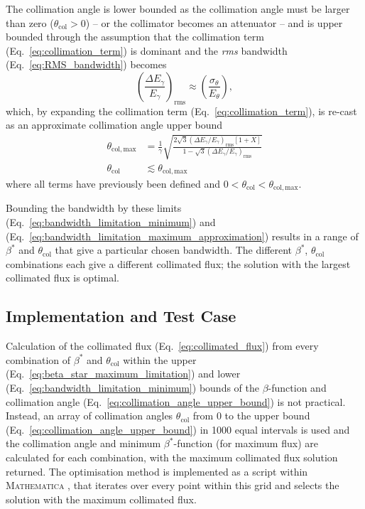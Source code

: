 \documentclass[../main.tex]{subfiles}
\begin{document}
The collimation angle is lower bounded as the collimation angle must be larger than zero ($\theta_{\mathrm{col}}>0$) -- or the collimator becomes an attenuator -- and is upper bounded through the assumption that the collimation term (Eq.~\ref{eq:collimation_term}) is dominant and the \textit{rms} bandwidth (Eq.~\ref{eq:RMS_bandwidth}) becomes
\begin{equation}
\left(\frac{\Delta E_{\gamma}}{E_{\gamma}}\right)_{\mathrm{rms}} \approx \left(\frac{\sigma_{\theta}}{E_{\theta}}\right),    
\label{eq:collimation_dominant}
\end{equation}
which, by expanding the collimation term (Eq.~\ref{eq:collimation_term}), is re-cast as an approximate collimation angle upper bound  
\begin{align}
\theta_{\mathrm{col},\mathrm{max}} &= \frac{1}{\gamma}\sqrt{\frac{2\sqrt{3}\left(\Delta E_{\gamma}/E_{\gamma}\right)_{\mathrm{rms}}\left[1+X\right]}{1-\sqrt{3}\left(\Delta E_{\gamma}/E_{\gamma}\right)_{\mathrm{rms}}}} \nonumber\\
\theta_{\mathrm{col}} &\lesssim \theta_{\mathrm{col},\mathrm{max}}
\label{eq:collimation_angle_upper_bound}    
\end{align}
where all terms have previously been defined and $0<\theta_{\mathrm{col}}<\theta_{\mathrm{col},\mathrm{max}}$.
 
Bounding the bandwidth by these limits (Eq.~\ref{eq:bandwidth_limitation_minimum}) and  (Eq.~\ref{eq:bandwidth_limitation_maximum_approximation}) results in a range of $\beta^{*}$ and $\theta_{\mathrm{col}}$ that give a particular chosen bandwidth. The different $\beta^{*}$, $\theta_{\mathrm{col}}$ combinations each give a different collimated flux; the solution with the largest collimated flux is optimal.

\subsection{Implementation and Test Case}

Calculation of the collimated flux (Eq.~\ref{eq:collimated_flux}) from every combination of $\beta^{*}$ and $\theta_{\mathrm{col}}$ within the upper (Eq.~\ref{eq:beta_star_maximum_limitation}) and lower (Eq.~\ref{eq:bandwidth_limitation_minimum}) bounds of the $\beta$-function and collimation angle (Eq.~\ref{eq:collimation_angle_upper_bound}) is not practical. Instead, an array of collimation angles $\theta_{\mathrm{col}}$ from 0 to the upper bound (Eq.~\ref{eq:collimation_angle_upper_bound}) in 1000 equal intervals is used and the collimation angle and minimum $\beta^{*}$-function (for maximum flux) are calculated for each combination, with the maximum collimated flux solution returned. The optimisation method is implemented as a script within \textsc{Mathematica} \cite{wolfram2021nmaximize}, that iterates over every point within this grid and selects the solution with the maximum collimated flux. 
\end{document}
